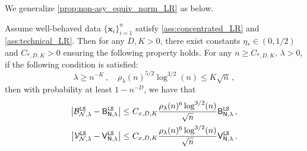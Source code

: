 We generalize \cref{prop:non-asy_equiv_norm_LR} as below.
\begin{theorem}\label{prop:det_equiv_LR}
    Assume well-behaved data $\{ \bm x_i \}_{i=1}^n$ satisfy \cref{ass:concentrated_LR} and \cref{ass:technical_LR}. Then for any $D,K > 0$, there exist constants $\eta_* \in (0, 1/2)$ and $C_{*,D,K} > 0$ ensuring the following property holds. For any $n \geq C_{*,D,K}$, $\lambda > 0$, if the following condition is satisfied:
    \begin{equation*}
        \lambda \geq n^{-K}\,, \quad \rho_{\lambda}(n)^{5/2} \log^{3/2}(n) \leq K \sqrt{n}\,,
    \end{equation*} 
    then with probability at least $1-n^{-D}$, we have that
    \[
    \begin{aligned}
         \left|\mathcal{B}_{\mathcal{N},\lambda}^{\tt LS} - \mathsf B_{\mathsf N,\lambda}^{\tt LS}\right| \leq&~ C_{x, D, K} \frac{\rho_{\lambda}(n)^6 \log^{3/2}(n)}{\sqrt{n}}\mathsf B_{\mathsf N,\lambda}^{\tt LS}\,,\\
        \left|\mathcal{V}_{\mathcal{N},\lambda}^{\tt LS} - \mathsf V_{\mathsf N,\lambda}^{\tt LS}\right| \leq&~ C_{x, D, K} \frac{\rho_{\lambda}(n)^6 \log^{3/2}(n)}{\sqrt{n}} \mathsf V_{\mathsf N,\lambda}^{\tt LS}\,.
    \end{aligned}
    \]
\end{theorem}

